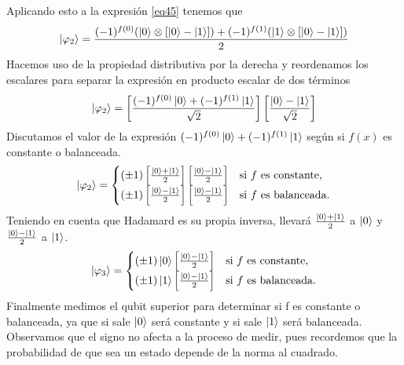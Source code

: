 \documentclass[a4paper]{article}
\numberwithin{equation}{section}
\begin{document}
Aplicando esto a la expresión \ref{eq45} tenemos que
\begin{equation}
\ket{\varphi_2} = 
\frac{(-1)^{f(0)} (\ket{0} \otimes \left[ \ket{0} - \ket{1} \right]) + (-1)^{f(1)} (\ket{1} \otimes \left[ \ket{0} - \ket{1} \right])}{2}
\end{equation}
Hacemos uso de la propiedad distributiva por la derecha y reordenamos los escalares para separar la expresión en producto escalar de dos términos
\begin{equation}
\ket{\varphi_2} =
\left[ \frac{(-1)^{f(0)} \ket{0} + (-1)^{f(1)} \ket{1}}{\sqrt{2}} \right]
\left[ \frac{\ket{0} - \ket{1}}{\sqrt{2}} \right]
\end{equation}
Discutamos el valor de la expresión $(-1)^{f(0)} \ket{0} + (-1)^{f(1)} \ket{1}$ según si $f(x)$ es constante o balanceada.
\begin{equation}
\ket{\varphi_2} = 
\begin{cases}
(\pm 1) \left[\frac{\ket{0}+\ket{1}}{2}\right] \left[\frac{\ket{0}-\ket{1}}{2}\right] & \textrm{si } f \textrm{ es constante,} \\
(\pm 1) \left[\frac{\ket{0}-\ket{1}}{2}\right] \left[\frac{\ket{0}-\ket{1}}{2}\right] & \textrm{si } f \textrm{ es balanceada.}
\end{cases}
\end{equation}
Teniendo en cuenta que Hadamard es su propia inversa, llevará $\frac{\ket{0}+\ket{1}}{2}$ a $\ket{0}$ y $\frac{\ket{0}-\ket{1}}{2}$ a $\ket{1}$.
\begin{equation}
\ket{\varphi_3} = 
\begin{cases}
(\pm 1) \ket{0} \left[\frac{\ket{0}-\ket{1}}{2}\right] & \textrm{si } f \textrm{ es constante,} \\
(\pm 1) \ket{1} \left[\frac{\ket{0}-\ket{1}}{2}\right] & \textrm{si } f \textrm{ es balanceada.}
\end{cases}
\end{equation}
Finalmente medimos el qubit superior para determinar si f es constante o balanceada, ya que si sale $\ket{0}$ será constante y si sale $\ket{1}$ será balanceada. Observamos que el signo no afecta a la proceso de medir, pues recordemos que la probabilidad de que sea un estado depende de la norma al cuadrado.

\end{document}
